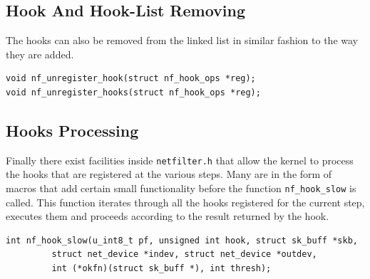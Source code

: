 \documentclass[a4paper,10pt]{article}
\begin{document}
\subsection{Hook And Hook-List Removing}\label{hook_removing}
The hooks can also be removed from the linked list in similar fashion to the way they are added.

\begin{lstlisting}
void nf_unregister_hook(struct nf_hook_ops *reg);
void nf_unregister_hooks(struct nf_hook_ops *reg);
\end{lstlisting}

\subsection{Hooks Processing}\label{hooks_processing}
Finally there exist facilities inside \verb|netfilter.h| that allow the kernel to process the hooks that are registered at the various steps. Many are in the form of macros that add certain small functionality before the function \verb|nf_hook_slow| is called. This function iterates through all the hooks registered for the current step, executes them and proceeds according to the result returned by the hook.

\begin{lstlisting}
int nf_hook_slow(u_int8_t pf, unsigned int hook, struct sk_buff *skb,
		 struct net_device *indev, struct net_device *outdev,
		 int (*okfn)(struct sk_buff *), int thresh);
\end{lstlisting}





\end{document}
